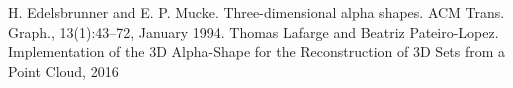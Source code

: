 \documentclass[12pt]{article} %
\begin{document}
	

	\newpage
	\begin{thebibliography}{}
		H. Edelsbrunner and E. P. Mucke. Three-dimensional alpha shapes. ACM Trans. Graph., 13(1):43–72, January 1994.
		Thomas Lafarge and Beatriz Pateiro-Lopez. Implementation of the 3D Alpha-Shape for the Reconstruction of 3D Sets from a Point Cloud, 2016
		
	\end{thebibliography}
	\newpage
\end{document}
